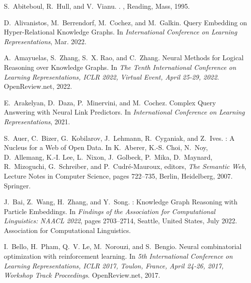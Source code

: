 \documentclass[11pt]{article}
\begin{document}
\begin{thebibliography}{10}
\itemsep=1pt
\begin{small}

S.~Abiteboul, R.~Hull, and V.~Vianu.
.
, {Reading, Mass}, 1995.

D.~Alivanistos, M.~Berrendorf, M.~Cochez, and M.~Galkin.
\newblock Query {{Embedding}} on {{Hyper-Relational Knowledge Graphs}}.
\newblock In {\em International {{Conference}} on {{Learning
			Representations}}}, Mar. 2022.

A.~Amayuelas, S.~Zhang, S.~X. Rao, and C.~Zhang.
\newblock Neural {{Methods}} for {{Logical Reasoning}} over {{Knowledge
		Graphs}}.
\newblock In {\em The {{Tenth International Conference}} on {{Learning
			Representations}}, {{ICLR}} 2022, {{Virtual Event}}, {{April}} 25-29, 2022}.
{OpenReview.net}, 2022.

E.~Arakelyan, D.~Daza, P.~Minervini, and M.~Cochez.
\newblock Complex {{Query Answering}} with {{Neural Link Predictors}}.
\newblock In {\em International {{Conference}} on {{Learning
			Representations}}}, 2021.

S.~Auer, C.~Bizer, G.~Kobilarov, J.~Lehmann, R.~Cyganiak, and Z.~Ives.
: {{A Nucleus}} for a {{Web}} of {{Open Data}}.
\newblock In K.~Aberer, K.-S. Choi, N.~Noy, D.~Allemang, K.-I. Lee, L.~Nixon,
J.~Golbeck, P.~Mika, D.~Maynard, R.~Mizoguchi, G.~Schreiber, and
P.~{Cudr{\'e}-Mauroux}, editors, {\em The {{Semantic Web}}}, Lecture
{{Notes}} in {{Computer Science}}, pages 722--735, {Berlin, Heidelberg},
2007. {Springer}.

J.~Bai, Z.~Wang, H.~Zhang, and Y.~Song.
: {{Knowledge Graph Reasoning}} with {{Particle
		Embeddings}}.
\newblock In {\em Findings of the {{Association}} for {{Computational
			Linguistics}}: {{NAACL}} 2022}, pages 2703--2714, {Seattle, United States},
July 2022. {Association for Computational Linguistics}.

I.~Bello, H.~Pham, Q.~V. Le, M.~Norouzi, and S.~Bengio.
\newblock Neural combinatorial optimization with reinforcement learning.
\newblock In {\em 5th International Conference on Learning Representations,
	{ICLR} 2017, Toulon, France, April 24-26, 2017, Workshop Track Proceedings}.
OpenReview.net, 2017.


\end{small}
\end{thebibliography}
\end{document}

